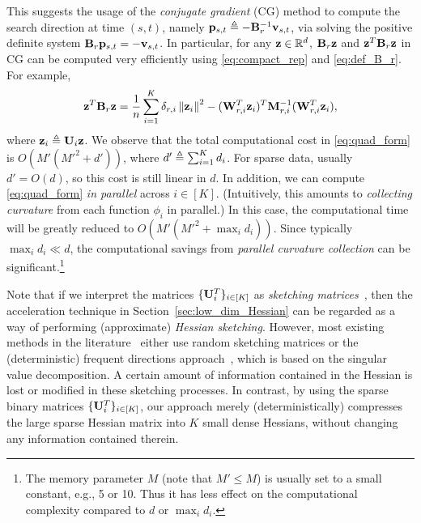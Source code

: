 \documentclass[10pt,twocolumn,journal]{IEEEtran}
\begin{document}
This suggests the usage of the {\em conjugate gradient} (CG) method to compute the search direction at time $(s,t)$, namely $\mathbf{p}_{s,t}\triangleq -\mathbf{B}_r^{-1}\mathbf{v}_{s,t}$, via solving the positive definite system $\mathbf{B}_r\mathbf{p}_{s,t}=-\mathbf{v}_{s,t}$. In particular, for any $\mathbf{z}\in\mathbb{R}^d$, $\mathbf{B}_r\mathbf{z}$ and $\mathbf{z}^T\mathbf{B}_r\mathbf{z}$ in CG can be computed very efficiently using \eqref{eq:compact_rep} and \eqref{eq:def_B_r}. For example, %
\begin{align}
\bz^T\bB_r\bz=\frac{1}{n}\sum_{i=1}^K \delta_{r,i}\norm{\bz_i}^2 -(\bW_{r,i}^T\bz_i)^T
\bM_{r,i}^{-1}(\bW_{r,i}^T\bz_i),\label{eq:quad_form}\vspace{-.5cm}
\end{align} 
where $\mathbf{z}_i\triangleq \mathbf{U}_i\mathbf{z}$. We observe that the total computational cost in \eqref{eq:quad_form} is $O(M'({M'}^2+d'))$, where $d'\triangleq \sum_{i=1}^K d_i$. For sparse data, usually $d'=O(d)$, so this cost is still linear in $d$. In addition, %
we can compute \eqref{eq:quad_form} {\em in  parallel} across $i\in[K]$. %
(Intuitively, this amounts to {\em collecting curvature} from each function $\phi_i$ in parallel.)
In this case, the computational time will be greatly reduced to $O(M'({M'}^2+\max_{i}d_i))$. Since typically $\max_{i}d_i \ll d$, %
the computational savings from {\em parallel curvature collection} can be significant.\footnote{The memory parameter $M$ (note that $M'\le M$) is usually set to a small constant, e.g., 5 or 10. Thus it has less effect on the computational complexity compared to $d$ or $\max_{i}d_i$.}

\begin{remark}\label{rmk:Hessian_sketch}
Note that if we interpret the matrices $\{\mathbf{U}_i^T\}_{i\in[K]}$ as {\em sketching matrices}~\cite{Woodruff_14}, then the acceleration technique in Section~\ref{sec:low_dim_Hessian} can be regarded as a way of performing (approximate) {\em Hessian sketching}. However, most existing methods in the literature~\cite{Pilanci_16,Luo_16,Gower_16,Pilanci_17} either use random sketching matrices or the (deterministic) frequent directions approach~\cite{Ghash_16}, which is based on the singular value decomposition. A certain amount of information contained in the Hessian is lost or modified in these sketching processes. In contrast, by using the sparse binary matrices $\{\mathbf{U}_i^T\}_{i\in[K]}$, our approach merely (deterministically) compresses the large sparse Hessian matrix into $K$ small dense Hessians, without changing any information contained therein. 
\end{remark}
\end{document}
